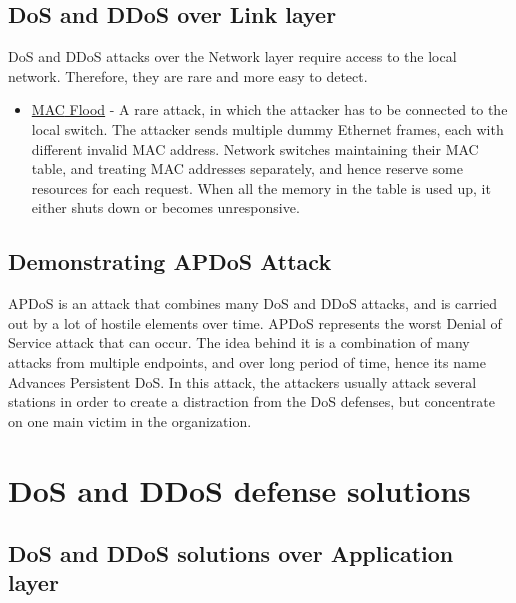 \documentclass{report}
\begin{document}
\subsection {DoS and DDoS over Link layer}  

 \hfill \break \gls{DoS} and \gls{DDoS} attacks over the Network layer require access to the local network. Therefore, they are rare and more easy to detect.
\begin{itemize}
\item\underline{\gls{MAC} Flood} - A rare attack, in which the attacker has to be connected to the local switch. The attacker sends multiple dummy Ethernet frames, each with different invalid \gls{MAC} address. Network switches maintaining their \gls{MAC} table, and treating \gls{MAC} addresses separately, and hence reserve some resources for each request. When all the memory in the table is used up, it either shuts down or becomes unresponsive.
\end{itemize}


 \hfill \break
\subsection {Demonstrating APDoS Attack}

 \hfill \break  \gls{APDoS} is an attack that combines many \gls{DoS} and \gls{DDoS} attacks, and is carried out by a lot of hostile elements over time. \gls{APDoS} represents the worst Denial of Service attack that can occur. The idea behind it is a combination of many attacks from multiple endpoints, and over long period of time, hence its name Advances Persistent \gls{DoS}. In this attack, the attackers usually attack several stations in order to create a distraction from the \gls{DoS} defenses, but concentrate on one main victim in the organization.
\newpage
\section{DoS and DDoS defense solutions }

\subsection{DoS and DDoS solutions over Application layer}
 
\end{document}
